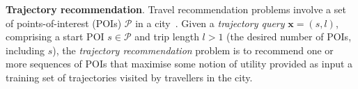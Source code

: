 


\textbf{Trajectory recommendation}.
Travel recommendation problems involve a set of points-of-interest (POIs) $\mathcal{P}$ in a city~\cite{bao2015recommendations,zheng2015trajectory,zheng2014urban}.
Given a \emph{trajectory query} $\mathbf{x} = (s, l)$,
comprising a start POI $s \in \mathcal{P}$ and trip length
$l \!>\! 1$ (\ie the desired number of POIs, including $s$),
the \emph{trajectory recommendation} problem is to
recommend one or more sequences of POIs %
that maximise some notion of utility
provided as input a training set
of trajectories visited by travellers in the city.


